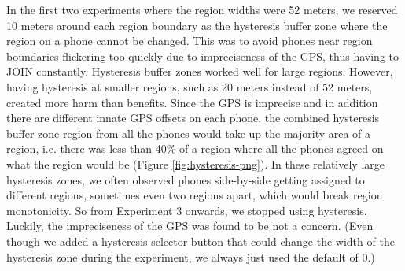 In the first two experiments where the region widths were 52 meters, we reserved 10 meters around each region boundary as the hysteresis buffer zone where the region on a phone cannot be changed. This was to avoid phones near region boundaries flickering too quickly due to impreciseness of the GPS, thus having to JOIN constantly. Hysteresis buffer zones worked well for large regions. However, having hysteresis at smaller regions, such as 20 meters instead of 52 meters, created more harm than benefits. Since the GPS is imprecise and in addition there are different innate GPS offsets on each phone, the combined hysteresis buffer zone region from all the phones would take up the majority area of a region, i.e. there was less than 40\% of a region where all the phones agreed on what the region would be (Figure \ref{fig:hysteresis-png}). In these relatively large hysteresis zones, we often observed phones side-by-side getting assigned to different regions, sometimes even two regions apart, which would break region monotonicity. So from Experiment 3 onwards, we stopped using hysteresis. Luckily, the impreciseness of the GPS was found to be not a concern. (Even though we added a hysteresis selector button that could change the width of the hysteresis zone during the experiment, we always just used the default of 0.)
